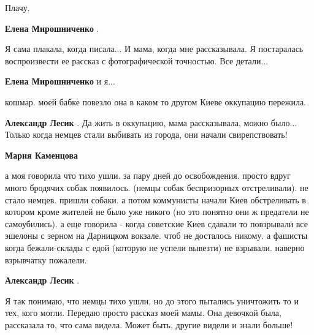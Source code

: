  
 
 
 
 
\zzSecCmt

\begin{itemize} %
Плачу.

\begin{itemize} %
\textbf{Елена Мирошниченко} . 

Я сама плакала, когда писала... И мама, когда мне рассказывала. Я постаралась
воспроизвести ее рассказ с фотографической точностью. Все детали...


\textbf{Елена Мирошниченко} и я...

\end{itemize} %

кошмар. моей бабке повезло она в каком то другом Киеве оккупацию пережила.

\begin{itemize} %
\textbf{Александр Лесик} . Да жить в оккупацию, мама рассказывала, можно было... Только когда немцев стали выбивать из города, они начали свирепствовать!

\begin{itemize} %
\textbf{Мария Каменцова} 

а моя говорила что тихо ушли. за пару дней до освобождения. просто вдруг много
бродячих собак появилось. (немцы собак беспризорных отстреливали). не стало
немцев. пришли собаки. а потом коммунисты начали Киев обстреливать в котором
кроме жителей не было уже никого (но это понятно они ж предатели не
самоубились). а еще говорила - когда советские Киев сдавали то повзрывали все
эшелоны с зерном на Дарницком вокзале. чтоб не досталось никому. а фашисты когда
бежали-склады с едой (которую не успели вывезти) не взрывали. наверно взрывчатку
пожалели.

\textbf{Александр Лесик} . 

Я так понимаю, что немцы тихо ушли, но до этого пытались уничтожить то и тех,
кого могли. Передаю просто рассказ моей мамы. Она девочкой была, рассказала то,
что сама видела. Может быть, другие видели и знали больше!


\end{itemize}
\end{itemize}
\end{itemize}
